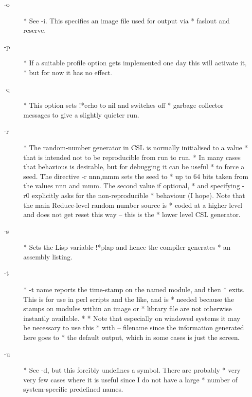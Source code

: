 \documentclass[a4paper,11pt]{article}
\begin{document}
\begin{description}
\item [{\ttfamily -o}] 
          * See {\ttfamily -i}. This specifies an image file used for output via
          * {\ttfamily faslout} and {\ttfamily reserve}.

\item [{\ttfamily -p}] 
          * If a suitable profile option gets implemented one day this will activate it,
          * but for now it has no effect.

\item [{\ttfamily -q}] 
          * This option sets {\ttfamily !*echo} to {\ttfamily nil} and switches off
          * garbage collector messages to give a slightly quieter run.

\item [{\ttfamily -r}] 
          * The random-number generator in CSL is normally initialised to a value
          * that is intended not to be reproducible from run to run.
          * In many cases that behavious is desirable, but for debugging it can be useful
          * to force a seed. The directive {\ttfamily -r nnn,mmm} sets the seed to
          * up to 64 bits taken from the values nnn and mmm. The second value if optional,
          * and specifying {\ttfamily -r0}  explicitly asks for the non-reproducible
          * behaviour (I hope). Note that the main Reduce-level random number source is
          * coded at a higher level and does not get reset this way -- this is the
          * lower level CSL generator.

\item [{\ttfamily -s}] 
          * Sets the Lisp variable {\ttfamily !*plap} and hence the compiler generates
          * an assembly listing.

\item [{\ttfamily -t}] 
          * {\ttfamily -t name} reports the time-stamp on the named module, and then
          * exits. This is for use in perl scripts and the like, and is
          * needed because the stamps on modules within an image or
          * library file are not otherwise instantly available.
          *
          * Note that especially on windowed systems it may be necessary to use this
          * with {\ttfamily -- filename} since the information generated here goes to
          * the default output, which in some cases is just the screen.

\item [{\ttfamily -u}] 
          * See {\ttfamily -d}, but this forcibly undefines a symbol. There are probably
          * very very few cases where it is useful since I do not have a large
          * number of system-specific predefined names.


\end{description}
\end{document}
